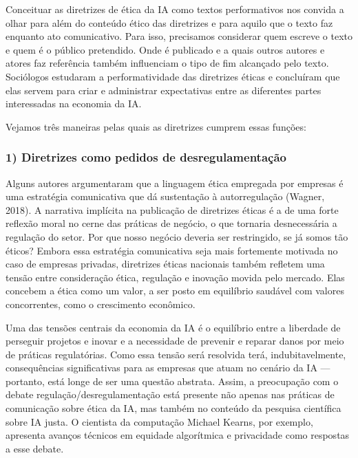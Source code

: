 \documentclass[
  11pt,
]{article}
\begin{document}
Conceituar as diretrizes de ética da IA como textos performativos nos
convida a olhar para além do conteúdo ético das diretrizes e para aquilo
que o texto faz enquanto ato comunicativo. Para isso, precisamos
considerar quem escreve o texto e quem é o público pretendido. Onde é
publicado e a quais outros autores e atores faz referência também
influenciam o tipo de fim alcançado pelo texto. Sociólogos estudaram a
performatividade das diretrizes éticas e concluíram que elas servem para
criar e administrar expectativas entre as diferentes partes interessadas
na economia da IA.

Vejamos três maneiras pelas quais as diretrizes cumprem essas funções:

\subsubsection{1) Diretrizes como pedidos de
desregulamentação}\label{diretrizes-como-pedidos-de-desregulamentauxe7uxe3o}

Alguns autores argumentaram que a linguagem ética empregada por empresas
é uma estratégia comunicativa que dá sustentação à autorregulação
(Wagner, 2018). A narrativa implícita na publicação de diretrizes éticas
é a de uma forte reflexão moral no cerne das práticas de negócio, o que
tornaria desnecessária a regulação do setor. Por que nosso negócio
deveria ser restringido, se já somos tão éticos? Embora essa estratégia
comunicativa seja mais fortemente motivada no caso de empresas privadas,
diretrizes éticas nacionais também refletem uma tensão entre
consideração ética, regulação e inovação movida pelo mercado. Elas
concebem a ética como um valor, a ser posto em equilíbrio saudável com
valores concorrentes, como o crescimento econômico.

Uma das tensões centrais da economia da IA é o equilíbrio entre a
liberdade de perseguir projetos e inovar e a necessidade de prevenir e
reparar danos por meio de práticas regulatórias. Como essa tensão será
resolvida terá, indubitavelmente, consequências significativas para as
empresas que atuam no cenário da IA --- portanto, está longe de ser uma
questão abstrata. Assim, a preocupação com o debate
regulação/desregulamentação está presente não apenas nas práticas de
comunicação sobre ética da IA, mas também no conteúdo da pesquisa
científica sobre IA justa. O cientista da computação Michael Kearns, por
exemplo, apresenta avanços técnicos em equidade algorítmica e
privacidade como respostas a esse debate.
\end{document}
